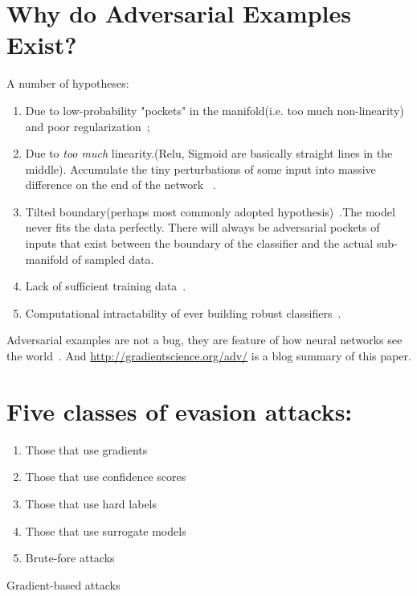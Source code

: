 \documentclass[11pt]{article}
\numberwithin{equation}{section}
\begin{document}
\section{Why do Adversarial Examples Exist?}

A number of hypotheses:

\begin{enumerate}
    \item Due to low-probability "pockets" in the manifold(i.e. too much non-linearity) and poor regularization~{\cite{szegedy2013intriguing}};
    \item Due to \textit{too much} linearity.(Relu, Sigmoid are basically straight lines in the middle). Accumulate the tiny perturbations of some input into massive difference on the end of the network ~{\cite{goodfellow2014explaining}}.
    \item Tilted boundary(perhaps most commonly adopted hypothesis)~\cite{tanay2016boundary}.The model never fits the data perfectly. There will always be adversarial pockets of inputs that exist between the boundary of the classifier and the actual sub-manifold of sampled data.
    \item Lack of sufficient training data~\cite{schmidt2018adversarially}.
    \item Computational intractability of ever building robust classifiers~\cite{bubeck2018adversarial}.
\end{enumerate}

Adversarial examples are not a bug, they are feature of how neural networks see the world~\cite{ilyas2019adversarial}. And \url{http://gradientscience.org/adv/} is a blog summary of this paper.

\section{Five classes of evasion attacks:}

\begin{enumerate}
    \item Those that use gradients
    \item Those that use confidence scores
    \item Those that use hard labels
    \item Those that use surrogate models
    \item Brute-fore attacks
\end{enumerate}

\colorbox{orange!15}{Gradient-based attacks}
\end{document}
